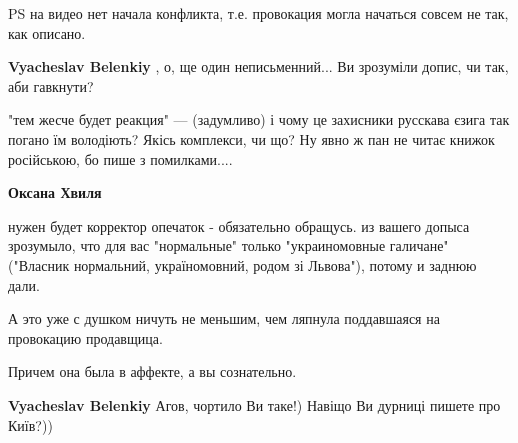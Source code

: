 \begin{itemize}
PS на видео нет начала конфликта, т.е. провокация могла начаться совсем не так,
как описано.

\begin{itemize}
 
\textbf{Vyacheslav Belenkiy} , о, ще один неписьменний... Ви зрозуміли допис, чи так, аби гавкнути?

 

"тем жесче будет реакция" — (задумливо) і чому це захисники русскава єзига так
погано їм володіють? Якісь комплекси, чи що? Ну явно ж пан не читає книжок
російською, бо пише з помилками....

 
\textbf{Оксана Хвиля} 

нужен будет корректор опечаток - обязательно обращусь.  из вашего допыса
зрозумыло, что для вас "нормальные" только "украиномовные галичане" ("Власник
нормальний, україномовний, родом зі Львова"), потому и заднюю дали.

А это уже с душком ничуть не меньшим, чем ляпнула поддавшаяся на провокацию
продавщица.

Причем она была в аффекте, а вы сознательно.

 
\textbf{Vyacheslav Belenkiy}
Агов, чортило Ви таке!)
Навіщо Ви дурниці пишете про Київ?))

 

\end{itemize}
\end{itemize}
